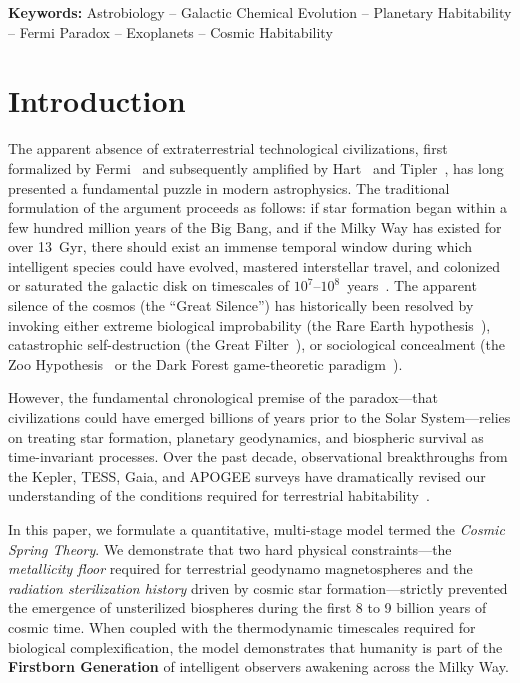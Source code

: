 \documentclass[11pt,a4paper]{article}
\begin{document}
\vspace{0.5cm}
\noindent\textbf{Keywords:} Astrobiology -- Galactic Chemical Evolution -- Planetary Habitability -- Fermi Paradox -- Exoplanets -- Cosmic Habitability

\section{Introduction}
\label{sec:intro}

The apparent absence of extraterrestrial technological civilizations, first formalized by Fermi~\cite{fermi1950} and subsequently amplified by Hart~\cite{hart1975} and Tipler~\cite{tipler1980}, has long presented a fundamental puzzle in modern astrophysics. The traditional formulation of the argument proceeds as follows: if star formation began within a few hundred million years of the Big Bang, and if the Milky Way has existed for over 13~Gyr, there should exist an immense temporal window during which intelligent species could have evolved, mastered interstellar travel, and colonized or saturated the galactic disk on timescales of $10^7\text{--}10^8$~years~\cite{jones1976,newman1981,cirkovic2009}. The apparent silence of the cosmos (the ``Great Silence'') has historically been resolved by invoking either extreme biological improbability (the Rare Earth hypothesis~\cite{ward2000}), catastrophic self-destruction (the Great Filter~\cite{hanson1998}), or sociological concealment (the Zoo Hypothesis~\cite{ball1973} or the Dark Forest game-theoretic paradigm~\cite{liu2008}).

However, the fundamental chronological premise of the paradox—that civilizations could have emerged billions of years prior to the Solar System—relies on treating star formation, planetary geodynamics, and biospheric survival as time-invariant processes. Over the past decade, observational breakthroughs from the Kepler, TESS, Gaia, and APOGEE surveys have dramatically revised our understanding of the conditions required for terrestrial habitability~\cite{petigura2013,buchhave2014,snaith2015}.

In this paper, we formulate a quantitative, multi-stage model termed the \emph{Cosmic Spring Theory}. We demonstrate that two hard physical constraints—the \emph{metallicity floor} required for terrestrial geodynamo magnetospheres and the \emph{radiation sterilization history} driven by cosmic star formation—strictly prevented the emergence of unsterilized biospheres during the first 8 to 9 billion years of cosmic time. When coupled with the thermodynamic timescales required for biological complexification, the model demonstrates that humanity is part of the \textbf{Firstborn Generation} of intelligent observers awakening across the Milky Way.
\end{document}
